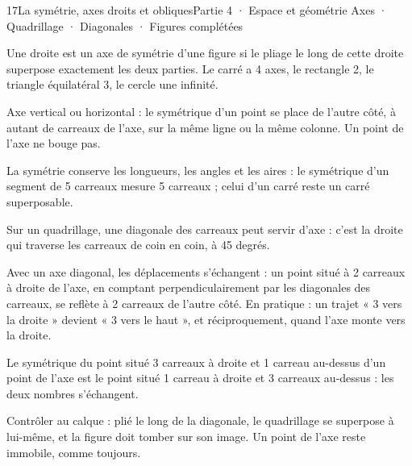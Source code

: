 \begin{ouverture}[geometrie]{17}{La symétrie, axes droits et obliques}{Partie 4 · Espace et géométrie}
{Axes · Quadrillage · Diagonales · Figures complétées}
\end{ouverture}
\pagestyle{otMain}\essentiel\fontsize{11}{15}\selectfont
{}\label{cours-17-1}
\begin{definition}Une droite est un axe de symétrie d’une figure si le pliage le long de cette droite superpose exactement les deux parties. Le carré a 4 axes, le rectangle 2, le triangle équilatéral 3, le cercle une infinité.\end{definition}
\label{fig-cours-17-1-cours-symetrie}

\begin{savoirfaire}Axe vertical ou horizontal : le symétrique d’un point se place de l’autre côté, à autant de carreaux de l’axe, sur la même ligne ou la même colonne. Un point de l’axe ne bouge pas.\end{savoirfaire}
\begin{propriete}La symétrie conserve les longueurs, les angles et les aires : le symétrique d’un segment de 5 carreaux mesure 5 carreaux ; celui d’un carré reste un carré superposable.\end{propriete}
\clearpage
{}\label{cours-17-2}
\begin{definition}Sur un quadrillage, une diagonale des carreaux peut servir d’axe : c’est la droite qui traverse les carreaux de coin en coin, à 45 degrés.\end{definition}
\label{fig-cours-17-2-cours-diagonale}

\begin{savoirfaire}Avec un axe diagonal, les déplacements s’échangent : un point situé à 2 carreaux à droite de l’axe, en comptant perpendiculairement par les diagonales des carreaux, se reflète à 2 carreaux de l’autre côté. En pratique : un trajet « 3 vers la droite » devient « 3 vers le haut », et réciproquement, quand l’axe monte vers la droite.\end{savoirfaire}
\begin{exemple}Le symétrique du point situé 3 carreaux à droite et 1 carreau au-dessus d’un point de l’axe est le point situé 1 carreau à droite et 3 carreaux au-dessus : les deux nombres s’échangent.\end{exemple}
\begin{attention}Contrôler au calque : plié le long de la diagonale, le quadrillage se superpose à lui-même, et la figure doit tomber sur son image. Un point de l’axe reste immobile, comme toujours.\end{attention}

